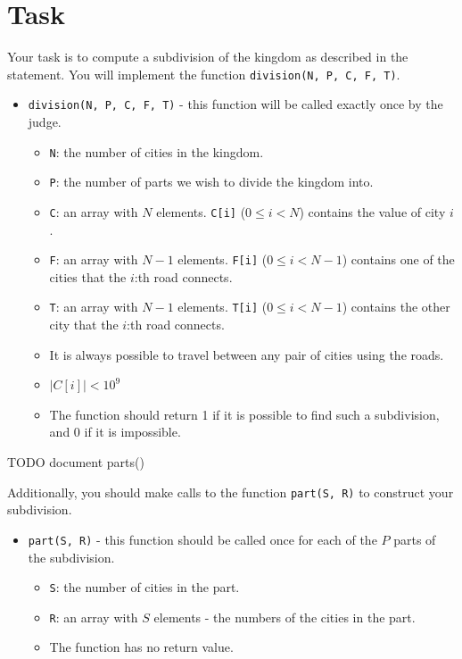 \section*{Task}
Your task is to compute a subdivision of the kingdom as described in the statement. You will implement the function \texttt{division(N, P, C, F, T)}.

\begin{itemize}
  \item \texttt{division(N, P, C, F, T)} - this function will be called exactly once by the judge.
  \begin{itemize}
    \item \texttt{N}: the number of cities in the kingdom.
    \item \texttt{P}: the number of parts we wish to divide the kingdom into.
    \item \texttt{C}: an array with $N$ elements. \texttt{C[i]} ($0 \le i < N$) contains the value of city $i$.
    \item \texttt{F}: an array with $N - 1$ elements. \texttt{F[i]} ($0 \le i < N - 1$) contains one of the cities that the $i$:th road connects.
    \item \texttt{T}: an array with $N - 1$ elements. \texttt{T[i]} ($0 \le i < N - 1$) contains the other city that the $i$:th road connects.
    \item It is always possible to travel between any pair of cities using the roads.
    \item $|C[i]| < 10^9$
    \item The function should return 1 if it is possible to find such a subdivision,
      and 0 if it is impossible.
  \end{itemize}
\end{itemize}

TODO document parts()

Additionally, you should make calls to the function \texttt{part(S, R)} to construct your subdivision.
\begin{itemize}
  \item \texttt{part(S, R)} - this function should be called once for each of the $P$ parts of the subdivision.
  \begin{itemize}
    \item \texttt{S}: the number of cities in the part.
    \item \texttt{R}: an array with $S$ elements - the numbers of the cities in the part.
    \item The function has no return value.
  \end{itemize}
\end{itemize}

